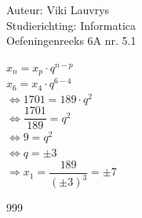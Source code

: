 \documentclass[a4paper]{article}
\begin{document}
  
\noindent \large Auteur: Viki	Lauvrys \\
\noindent \large Studierichting: Informatica\\
\noindent \large Oefeningenreeks 6A nr. 5.1\\

\medskip

\normalsize

$ x_n = x_p \cdot q^{n-p} $ \\

$ x_6 = x_4 \cdot q^{6-4} $ \\

$ \Leftrightarrow 1701 = 189 \cdot q^2 $ \\

$ \Leftrightarrow \dfrac{1701}{189} = q^2 $ \\

$ \Leftrightarrow 9 = q^2 $ \\

$ \Leftrightarrow q = \pm 3 $ \\

$ \Rightarrow x_1 = \dfrac{189}{(\pm 3)^3} = \pm 7$ \\

\begin{thebibliography}{999}
\end{thebibliography}
\end{document}
